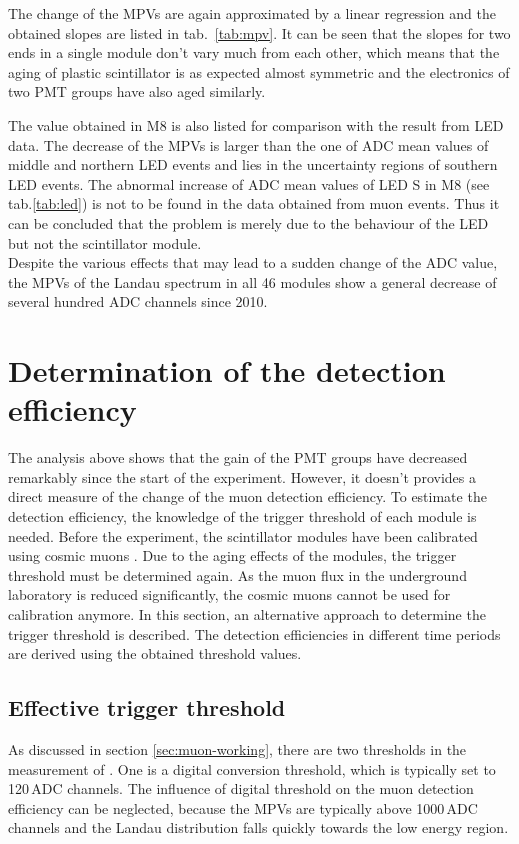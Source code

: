 The change of the MPVs are again approximated by a linear regression and the obtained slopes are listed in tab.\ \ref{tab:mpv}. It can be seen that the slopes for two ends in a single module don't vary much from each other, which means that the aging of plastic scintillator is as expected almost symmetric and the electronics of two PMT groups have also aged similarly.

The value obtained in M8 is also listed for comparison with the result from LED data. The decrease of the MPVs is larger than the one of ADC mean values of middle and northern LED events and lies in the uncertainty regions of southern LED events. The abnormal increase of ADC mean values of LED S in M8 (see tab.\ref{tab:led}) is not to be found in the data obtained from muon events. Thus it can be concluded that the problem is merely due to the behaviour of the LED but not the scintillator module. \\
Despite the various effects that may lead to a sudden change of the ADC value, the MPVs of the Landau spectrum in all 46 modules show a general decrease of several hundred ADC channels since 2010.



\section{Determination of the detection efficiency}
The analysis above shows that the gain of the PMT groups have decreased remarkably since the start of the experiment. However, it doesn't provides a direct measure of the change of the muon detection efficiency. To estimate the detection efficiency, the knowledge of the trigger threshold of each module is needed. Before the experiment, the scintillator modules have been calibrated using cosmic muons \cite{Hab04}. Due to the aging effects of the modules, the trigger threshold must be determined again. As the muon flux in the underground laboratory is reduced significantly, the cosmic muons cannot be used for calibration anymore. In this section, an alternative approach to determine the trigger threshold is described. The detection efficiencies in different time periods are derived using the obtained threshold values.

\subsection{Effective trigger threshold}
As discussed in section \ref{sec:muon-working}, there are two thresholds in the measurement of \mvs. One is a digital conversion threshold, which is typically set to 120\,ADC channels. The influence of digital threshold on the muon detection efficiency can be neglected, because the MPVs are typically above 1000\,ADC channels and the Landau distribution falls quickly towards the low energy region.

